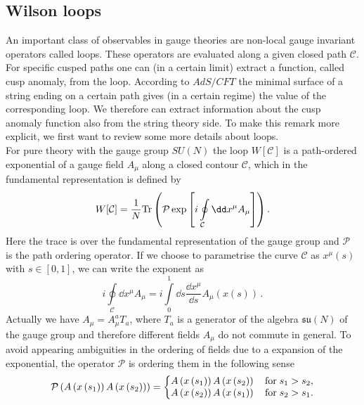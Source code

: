 \subsection{Wilson loops}
%
An important class of observables in gauge theories are non-local gauge invariant operators called  loops. These operators are evaluated along a given closed path $\mathcal{C}$. For specific cusped paths one can (in a certain limit) extract a function, called cusp anomaly, from the  loop. According to $AdS/CFT$ the minimal surface of a string ending on a certain path gives (in a certain regime) the value of the corresponding  loop. We therefore can extract information about the cusp anomaly function also from the string theory side. To make this remark more explicit, we first want to review some more details about  loops.\\
For pure  theory with the gauge group $SU(N)$ the  loop $W[\mathcal{C}]$ is a path-ordered exponential of a gauge field $A_{\mu}$ along a closed contour $\mathcal{C}$, which in the fundamental representation is defined by
%
%
\begin{equation}
W[\mathcal{C}] = \frac{1}{N}{\rm Tr} \left( \mathcal{P} \exp \left[ i \oint\limits_{\mathcal{C}} \dd x^{\mu}A_{\mu} \right] \right).
\end{equation}
%
%
Here the trace is over the fundamental representation of the gauge group and $\mathcal{P}$ is the path ordering operator. If we choose to parametrise the curve $\mathcal{C}$ as $x^{\mu}(s)$ with $s \in [0,1]$, we can write the exponent as
\begin{equation}
 i \oint\limits_{\mathcal{C}} \dd x^{\mu}A_{\mu} =  i \int\limits_{0}^{1} \dd s \frac{\dd x^{\mu}}{\dd s} A_{\mu}\left(x\left(s \right)\right)\,.
\end{equation}
Actually we have $A_{\mu}=A_{\mu}^{a}T_{a}$, where $T_{a}$ is a generator of the  algebra $\mathfrak{su}(N)$ of the gauge group and therefore different fields $A_{\mu}$ do not commute in general. To avoid appearing ambiguities in the ordering of fields due to a  expansion of the exponential, the operator $\mathcal{P}$ is ordering them in the following sense
\begin{equation}
\mathcal{P}\left( A\left(x\left(s_{1}\right)\right) A\left(x\left(s_{2}\right)\right) \right)
= \left\lbrace \begin{matrix}
A\left(x\left(s_{1}\right)\right) A\left(x\left(s_{2}\right)\right) \quad {\rm for} \; s_{1}>s_{2},  \\ 
A\left(x\left(s_{2}\right)\right) A\left(x\left(s_{1}\right)\right) \quad {\rm for} \; s_{2}>s_{1}.
\end{matrix} \right.
\end{equation}
%
%
%
